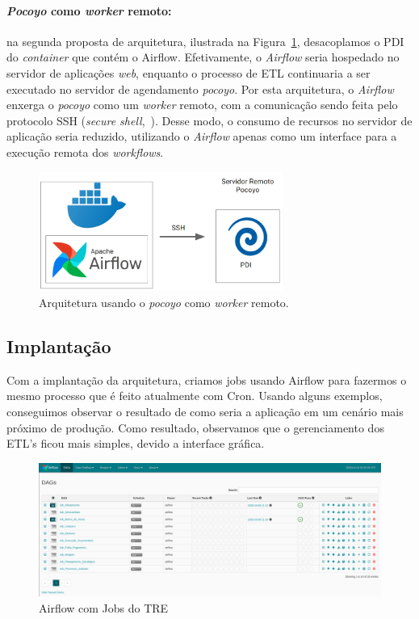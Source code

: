 \paragraph{\textit{Pocoyo} como \textit{worker} remoto:}
na segunda proposta de arquitetura, ilustrada na Figura~\ref{fig:ssh}, desacoplamos o PDI do \textit{container} que contém o Airflow. Efetivamente, o \textit{Airflow} seria hospedado no servidor de aplicações \textit{web}, enquanto o processo de ETL continuaria a ser executado no servidor de agendamento \textit{pocoyo}. Por esta arquitetura, o \textit{Airflow} enxerga o \textit{pocoyo} como um \textit{worker} remoto, com a comunicação sendo feita pelo protocolo SSH (\textit{secure shell},~\citet{}). Desse modo, o consumo de recursos no servidor de aplicação seria reduzido, utilizando o \textit{Airflow} apenas como um interface para a execução remota dos \textit{workflows}. 

\begin{figure}[htp]
    \centering
    \includegraphics[width=8cm]{Imagens/Arq_2}
    \caption{Arquitetura usando o \textit{pocoyo} como \textit{worker} remoto.}
    \label{fig:ssh}
\end{figure}

\subsection{Implantação}

Com a implantação da arquitetura, criamos jobs usando Airflow para fazermos o mesmo processo que é feito atualmente com Cron. Usando alguns exemplos, conseguimos observar o resultado de como seria a aplicação em um cenário mais próximo de produção. Como resultado, observamos que o gerenciamento dos ETL’s ficou mais simples, devido a interface gráfica.


\begin{figure}[htp]
    \centering
    \includegraphics[width=\linewidth]{Imagens/Airflow_End}
    \caption{Airflow com Jobs do TRE}
    \label{fig:airflow-tre}
\end{figure}
